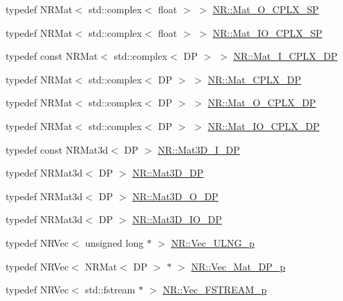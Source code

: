 \begin{DoxyCompactItemize}
\item 
typedef N\+R\+Mat$<$ std\+::complex$<$ float $>$ $>$ \mbox{\hyperlink{namespaceNR_a591476e0092fbdc3941716455dfe1391}{N\+R\+::\+Mat\+\_\+\+O\+\_\+\+C\+P\+L\+X\+\_\+\+SP}}
\item 
typedef N\+R\+Mat$<$ std\+::complex$<$ float $>$ $>$ \mbox{\hyperlink{namespaceNR_a4e456bc4660685058fb8a3f9e73220ef}{N\+R\+::\+Mat\+\_\+\+I\+O\+\_\+\+C\+P\+L\+X\+\_\+\+SP}}
\item 
typedef const N\+R\+Mat$<$ std\+::complex$<$ DP $>$ $>$ \mbox{\hyperlink{namespaceNR_ac71d287c73aca6bd25aef6debf83db29}{N\+R\+::\+Mat\+\_\+\+I\+\_\+\+C\+P\+L\+X\+\_\+\+DP}}
\item 
typedef N\+R\+Mat$<$ std\+::complex$<$ DP $>$ $>$ \mbox{\hyperlink{namespaceNR_a83c1447a6eed5061ad16601934856a19}{N\+R\+::\+Mat\+\_\+\+C\+P\+L\+X\+\_\+\+DP}}
\item 
typedef N\+R\+Mat$<$ std\+::complex$<$ DP $>$ $>$ \mbox{\hyperlink{namespaceNR_afb08c6dc458497ae43e0905f29e1e752}{N\+R\+::\+Mat\+\_\+\+O\+\_\+\+C\+P\+L\+X\+\_\+\+DP}}
\item 
typedef N\+R\+Mat$<$ std\+::complex$<$ DP $>$ $>$ \mbox{\hyperlink{namespaceNR_a8a17341866e8608bfddf21602c8b9f89}{N\+R\+::\+Mat\+\_\+\+I\+O\+\_\+\+C\+P\+L\+X\+\_\+\+DP}}
\item 
typedef const N\+R\+Mat3d$<$ DP $>$ \mbox{\hyperlink{namespaceNR_a3cb7a4c8eb0a2a98a239a9a8200ec5d8}{N\+R\+::\+Mat3\+D\+\_\+\+I\+\_\+\+DP}}
\item 
typedef N\+R\+Mat3d$<$ DP $>$ \mbox{\hyperlink{namespaceNR_a64c9c5cd3e465fce99c1068a62bbc9d3}{N\+R\+::\+Mat3\+D\+\_\+\+DP}}
\item 
typedef N\+R\+Mat3d$<$ DP $>$ \mbox{\hyperlink{namespaceNR_a74d09ea99e0452b529d2eb055cb09108}{N\+R\+::\+Mat3\+D\+\_\+\+O\+\_\+\+DP}}
\item 
typedef N\+R\+Mat3d$<$ DP $>$ \mbox{\hyperlink{namespaceNR_ae2c061d1bcce9ea856c905d761956d76}{N\+R\+::\+Mat3\+D\+\_\+\+I\+O\+\_\+\+DP}}
\item 
typedef N\+R\+Vec$<$ unsigned long $\ast$ $>$ \mbox{\hyperlink{namespaceNR_a4441bfbfcee00b3bdb45e5da10532ebe}{N\+R\+::\+Vec\+\_\+\+U\+L\+N\+G\+\_\+p}}
\item 
typedef N\+R\+Vec$<$ N\+R\+Mat$<$ DP $>$ $\ast$ $>$ \mbox{\hyperlink{namespaceNR_a13068a6bad16c3da37efbb289aae5b97}{N\+R\+::\+Vec\+\_\+\+Mat\+\_\+\+D\+P\+\_\+p}}
\item 
typedef N\+R\+Vec$<$ std\+::fstream $\ast$ $>$ \mbox{\hyperlink{namespaceNR_ace6a74f7f9700e1416d49842d8ac29ea}{N\+R\+::\+Vec\+\_\+\+F\+S\+T\+R\+E\+A\+M\+\_\+p}}
\end{DoxyCompactItemize}
